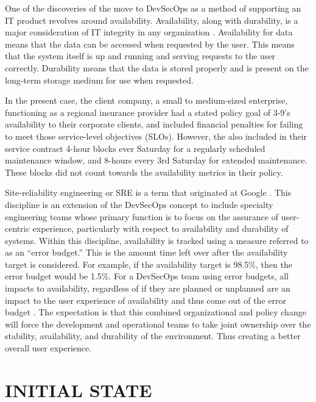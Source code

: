 \documentclass[doc]{apa7}
\begin{document}
One of the discoveries of the move to DevSecOps as a method of supporting an IT product revolves around availability. Availability, along with durability, is a major consideration of IT integrity in any organization \citep{ryderDataAvailabilityVs2016}. Availability for data means that the data can be accessed when requested by the user. This means that the system itself is up and running and serving requests to the user correctly. Durability means that the data is stored properly and is present on the long-term storage medium for use when requested.

In the present case, the client company, a small to medium-sized enterprise, functioning as a regional insurance provider had a stated policy goal of 3-9's availability to their corporate clients, and included financial penalties for failing to meet those service-level objectives (SLOs). However, the also included in their service contract 4-hour blocks ever Saturday for a regularly scheduled maintenance window, and 8-hours every 3rd Saturday for extended maintenance. These blocks did not count towards the availability metrics in their policy.

Site-reliability engineering or SRE is a term that originated at Google \citep[ch. 1]{murphySiteReliabilityEngineering2016}. This discipline is an extension of the DevSecOps concept to include specialty  engineering teams whose primary function is to focus on the assurance of user-centric experience, particularly with respect to availability and durability of systems. Within this discipline, availability is tracked using a measure referred to as an ``error budget.'' This is the amount time left over after the availability target is considered. For example, if the availability target is 98.5\%, then the error budget would be 1.5\%. For a DevSecOps team using error budgets, all impacts to availability, regardless of if they are planned or unplanned are an impact to the user experience of availability and thus come out of the error budget \citep[ch. 2]{murphySiteReliabilityEngineering2016}. The expectation is that this combined organizational and policy change will force the development and operational teams to take joint ownership over the stability, availability, and durability of the environment. Thus creating a better overall user experience.

\section{INITIAL STATE}
\label{sec:org1812d91}
\end{document}
